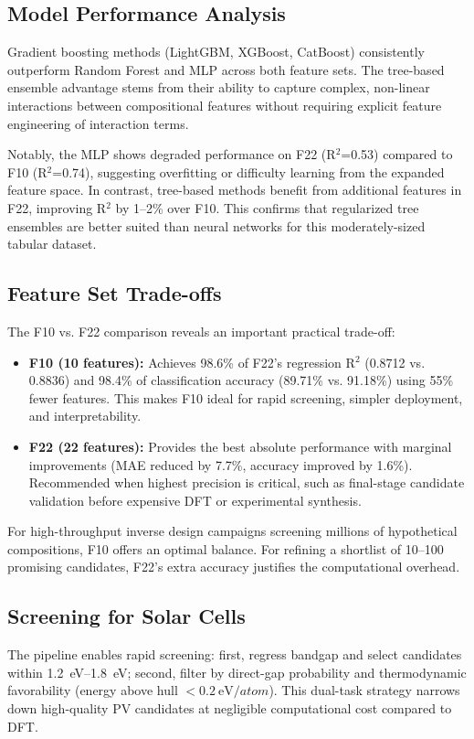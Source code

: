\documentclass[conference]{IEEEtran}
\begin{document}
\subsection{Model Performance Analysis}
Gradient boosting methods (LightGBM, XGBoost, CatBoost) consistently outperform Random Forest and MLP across both feature sets. The tree-based ensemble advantage stems from their ability to capture complex, non-linear interactions between compositional features without requiring explicit feature engineering of interaction terms.

Notably, the MLP shows degraded performance on F22 (R$^2$=0.53) compared to F10 (R$^2$=0.74), suggesting overfitting or difficulty learning from the expanded feature space. In contrast, tree-based methods benefit from additional features in F22, improving R$^2$ by 1--2\% over F10. This confirms that regularized tree ensembles are better suited than neural networks for this moderately-sized tabular dataset.

\subsection{Feature Set Trade-offs}
The F10 vs. F22 comparison reveals an important practical trade-off:
\begin{itemize}
  \item \textbf{F10 (10 features):} Achieves 98.6\% of F22's regression R$^2$ (0.8712 vs. 0.8836) and 98.4\% of classification accuracy (89.71\% vs. 91.18\%) using 55\% fewer features. This makes F10 ideal for rapid screening, simpler deployment, and interpretability.
  \item \textbf{F22 (22 features):} Provides the best absolute performance with marginal improvements (MAE reduced by 7.7\%, accuracy improved by 1.6\%). Recommended when highest precision is critical, such as final-stage candidate validation before expensive DFT or experimental synthesis.
\end{itemize}

For high-throughput inverse design campaigns screening millions of hypothetical compositions, F10 offers an optimal balance. For refining a shortlist of 10--100 promising candidates, F22's extra accuracy justifies the computational overhead.

\subsection{Screening for Solar Cells}
The pipeline enables rapid screening: first, regress bandgap and select candidates within \SIrange{1.2}{1.8}{\electronvolt}; second, filter by direct-gap probability and thermodynamic favorability (energy above hull $<\SI{0.2}{\electronvolt/atom}$). This dual-task strategy narrows down high-quality PV candidates at negligible computational cost compared to DFT.
\end{document}
